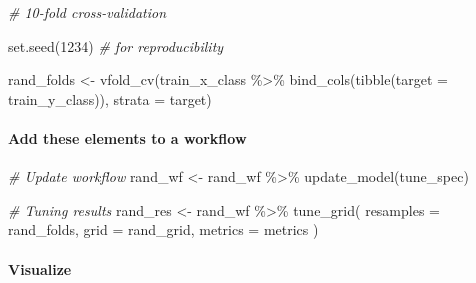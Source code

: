 \documentclass[
]{book}
\newenvironment{Shaded}{\begin{snugshade}}{\end{snugshade}}
\newcommand{\AttributeTok}[1]{\textcolor[rgb]{0.77,0.63,0.00}{#1}}
\newcommand{\CommentTok}[1]{\textcolor[rgb]{0.56,0.35,0.01}{\textit{#1}}}
\newcommand{\DecValTok}[1]{\textcolor[rgb]{0.00,0.00,0.81}{#1}}
\newcommand{\FunctionTok}[1]{\textcolor[rgb]{0.00,0.00,0.00}{#1}}
\newcommand{\NormalTok}[1]{#1}
\newcommand{\OtherTok}[1]{\textcolor[rgb]{0.56,0.35,0.01}{#1}}
\newcommand{\SpecialCharTok}[1]{\textcolor[rgb]{0.00,0.00,0.00}{#1}}
\begin{document}
\begin{Shaded}
\begin{Highlighting}[]
\CommentTok{\# 10{-}fold cross{-}validation}

\FunctionTok{set.seed}\NormalTok{(}\DecValTok{1234}\NormalTok{) }\CommentTok{\# for reproducibility }

\NormalTok{rand\_folds }\OtherTok{\textless{}{-}} \FunctionTok{vfold\_cv}\NormalTok{(train\_x\_class }\SpecialCharTok{\%\textgreater{}\%} \FunctionTok{bind\_cols}\NormalTok{(}\FunctionTok{tibble}\NormalTok{(}\AttributeTok{target =}\NormalTok{ train\_y\_class)),}
                       \AttributeTok{strata =}\NormalTok{ target)}
\end{Highlighting}
\end{Shaded}

\hypertarget{add-these-elements-to-a-workflow-2}{%
\paragraph{Add these elements to a workflow}\label{add-these-elements-to-a-workflow-2}}

\begin{Shaded}
\begin{Highlighting}[]
\CommentTok{\# Update workflow }
\NormalTok{rand\_wf }\OtherTok{\textless{}{-}}\NormalTok{ rand\_wf }\SpecialCharTok{\%\textgreater{}\%} \FunctionTok{update\_model}\NormalTok{(tune\_spec)}

\CommentTok{\# Tuning results }
\NormalTok{rand\_res }\OtherTok{\textless{}{-}}\NormalTok{ rand\_wf }\SpecialCharTok{\%\textgreater{}\%}
  \FunctionTok{tune\_grid}\NormalTok{(}
    \AttributeTok{resamples =}\NormalTok{ rand\_folds, }
    \AttributeTok{grid =}\NormalTok{ rand\_grid,}
    \AttributeTok{metrics =}\NormalTok{ metrics}
\NormalTok{  )}
\end{Highlighting}
\end{Shaded}

\hypertarget{visualize-2}{%
\paragraph{Visualize}\label{visualize-2}}
\end{document}
